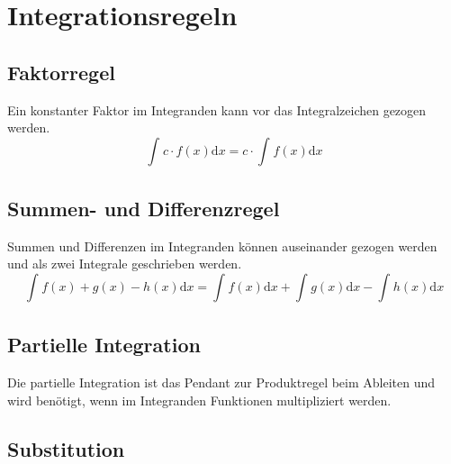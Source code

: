 \documentclass{article}
\author{Philipp Kiss}
\begin{document}
\section{Integrationsregeln}
\subsection{Faktorregel}
Ein konstanter Faktor im Integranden kann vor das Integralzeichen gezogen werden.
$$ \int_{}^{} c \cdot f(x) \mathrm{d}x = c \cdot \int_{}^{} f(x) \mathrm{d}x $$
\subsection{Summen- und Differenzregel}
Summen und Differenzen im Integranden können auseinander gezogen werden und als zwei Integrale geschrieben werden.
$$ \int_{}^{} f(x) + g(x) - h(x) \mathrm{d}x = \int_{}^{} f(x) \mathrm{d}x + \int_{}^{} g(x) \mathrm{d}x - \int_{}^{} h(x) \mathrm{d}x $$

\subsection{Partielle Integration}
Die partielle Integration ist das Pendant zur Produktregel beim Ableiten und wird benötigt, wenn im Integranden Funktionen multipliziert werden.
\subsection{Substitution}
\end{document}
